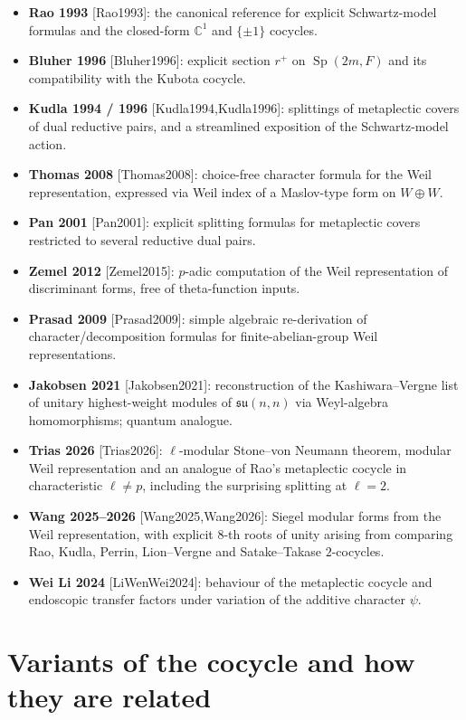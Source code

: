 \documentclass[11pt,letterpaper]{article}
\newcommand{\Sp}{\operatorname{Sp}}
\newcommand{\F}{F}
\newcommand{\C}{\mathbb{C}}
\theoremstyle{plain}
\theoremstyle{definition}
\begin{document}
\begin{itemize}[leftmargin=1.4em,itemsep=2pt]
\item \textbf{Rao 1993} [Rao1993]: the canonical reference for explicit Schwartz-model formulas and the closed-form $\C^1$ and $\{\pm 1\}$ cocycles.
\item \textbf{Bluher 1996} [Bluher1996]: explicit section $r^+$ on $\Sp(2m,\F)$ and its compatibility with the Kubota cocycle.
\item \textbf{Kudla 1994 / 1996} [Kudla1994,Kudla1996]: splittings of metaplectic covers of dual reductive pairs, and a streamlined exposition of the Schwartz-model action.
\item \textbf{Thomas 2008} [Thomas2008]: choice-free character formula for the Weil representation, expressed via Weil index of a Maslov-type form on $W\oplus W$.
\item \textbf{Pan 2001} [Pan2001]: explicit splitting formulas for metaplectic covers restricted to several reductive dual pairs.
\item \textbf{Zemel 2012} [Zemel2015]: $p$-adic computation of the Weil representation of discriminant forms, free of theta-function inputs.
\item \textbf{Prasad 2009} [Prasad2009]: simple algebraic re-derivation of character/decomposition formulas for finite-abelian-group Weil representations.
\item \textbf{Jakobsen 2021} [Jakobsen2021]: reconstruction of the Kashiwara--Vergne list of unitary highest-weight modules of $\mathfrak{su}(n,n)$ via Weyl-algebra homomorphisms; quantum analogue.
\item \textbf{Trias 2026} [Trias2026]: $\ell$-modular Stone--von Neumann theorem, modular Weil representation and an analogue of Rao's metaplectic cocycle in characteristic $\ell \ne p$, including the surprising splitting at $\ell = 2$.
\item \textbf{Wang 2025--2026} [Wang2025,Wang2026]: Siegel modular forms from the Weil representation, with explicit $8$-th roots of unity arising from comparing Rao, Kudla, Perrin, Lion--Vergne and Satake--Takase $2$-cocycles.
\item \textbf{Wei Li 2024} [LiWenWei2024]: behaviour of the metaplectic cocycle and endoscopic transfer factors under variation of the additive character $\psi$.
\end{itemize}

\section{Variants of the cocycle and how they are related}
\end{document}
